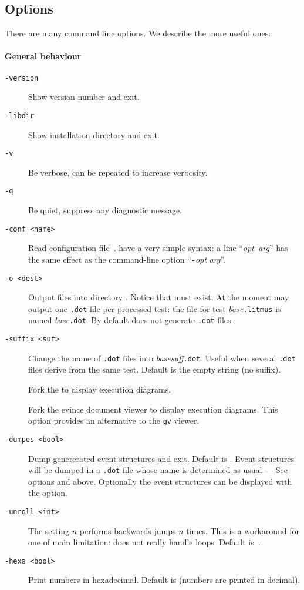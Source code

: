 \subsection{Options}
There are many command line options.
We describe the more useful ones:

\paragraph*{General behaviour}
\begin{description}
\item[{\tt -version}] Show version number and exit.
\item[{\tt -libdir}] Show installation directory and exit.
\item[{\tt -v}] Be verbose, can be repeated to increase verbosity.
\item[{\tt -q}] Be quiet, suppress any diagnostic message.
\item[{\tt -conf <name>}] Read configuration file~.
 have a very simple syntax:
a line ``\textit{opt}\texttt{  }\textit{arg}'' has the same effect as
the command-line option ``\texttt{-}\textit{opt} \textit{arg}''.
\item[{\tt -o <dest>}] Output files into directory .
Notice that  must exist.
At the moment \herd{} may output one \texttt{.dot} file per processed test:
the file for test \textit{base}\texttt{.litmus}
is named  \textit{base}\texttt{.dot}.
By default \herd{} does not generate \texttt{.dot} files.
\item[{\tt -suffix <suf>}] Change the name of \texttt{.dot} files
into \textit{base}\textit{suff}\texttt{.dot}. Useful when several \texttt{.dot} files derive from the same test. Default is the empty string (no suffix).
\item[{\tt {}}] Fork the  to display execution diagrams.
\item[{\tt {}}] Fork the evince document viewer to display execution diagrams. This option provides an alternative to the
{\tt gv} viewer.
\item[{\tt -dumpes <bool>}]
Dump genererated event structures and exit. Default is .
Event structures will be dumped in a \texttt{.dot} file whose
name is determined as usual --- See options  and  above.
Optionally the event structures can be displayed with the  option.
\item[{\tt -unroll <int>}] The setting $n$ performs backwards
jumps $n$ times. This is a workaround for one of \herd{} main limitation:
\herd{} does not really handle loops. Default is~.
\item[{\tt -hexa <bool>}] Print numbers in hexadecimal. Default is 
(numbers are printed in decimal).
\end{description}

